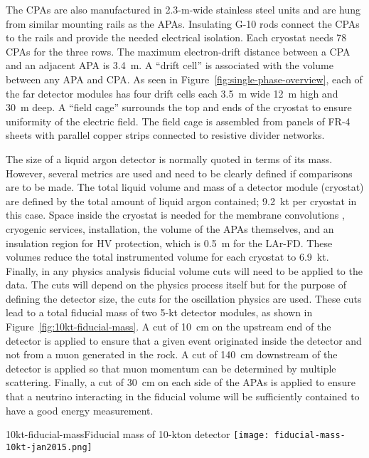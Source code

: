  The CPAs are also manufactured in 2.3-m-wide stainless steel units and are hung from similar mounting rails as the APAs. Insulating G-10 rods connect the CPAs to the rails and provide the needed electrical isolation. Each cryostat  needs 78 CPAs for the three rows.%
 The maximum electron-drift distance between a CPA and an adjacent APA is 3.4~m. A ``drift cell'' is associated with the volume between any APA and CPA. As seen in Figure~\ref{fig:single-phase-overview}, each of the far detector modules has four drift cells each 3.5~m wide 12~m high and 30~m deep.  A ``field cage'' surrounds the top and ends of the cryostat to ensure uniformity of the electric field. The field cage is assembled from panels of FR-4 sheets with parallel copper strips connected to resistive divider networks.

The size of a liquid argon detector is normally %
quoted in terms of its mass. However, several metrics are used and need to be clearly defined if comparisons are to be made. The total liquid volume %
and mass of a detector module (cryostat) %
are defined by the total amount of liquid argon contained;%
9.2~kt per cryostat in this case. %
Space inside the cryostat is needed for the membrane convolutions , cryogenic services, installation, the volume of the APAs themselves, and an insulation region for HV protection, which is 0.5~m for the LAr-FD. These volumes reduce the total instrumented volume for each %
cryostat to 6.9~kt. Finally, in any physics analysis fiducial volume cuts will need to be applied to the data. The cuts will depend on the physics process itself but for the purpose of defining the detector size, the cuts for the oscillation physics are used. These cuts %
lead to a total fiducial mass of two 5-kt detector modules, as shown in Figure~\ref{fig:10kt-fiducial-mass}. A cut of 10~cm on the upstream end of the detector is applied to ensure that a given event originated inside the detector and not from a muon generated in the rock. A cut of 140~cm downstream of the detector is applied so that muon momentum can be determined by multiple scattering. Finally, a cut of 30~cm on each side of the APAs is applied to ensure that a neutrino interacting in the fiducial volume will be sufficiently contained to have a good energy measurement.

\begin{cdrfigure}{10kt-fiducial-mass}{Fiducial mass of 10-kton detector}
 \texttt{[image: fiducial-mass-10kt-jan2015.png]}
 \end{cdrfigure}

